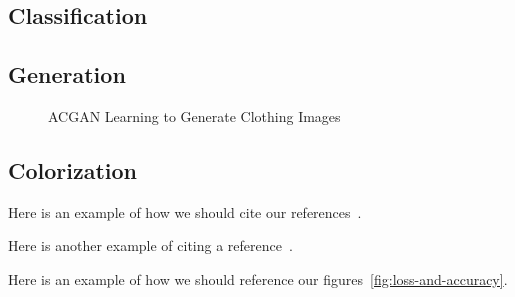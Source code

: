 \documentclass[conference]{IEEEtran}
\begin{document}
    \subsection{Classification}\label{subsec:results-classification}

    \subsection{Generation}\label{subsec:results-generation}

    \begin{figure}
        \caption{ACGAN Learning to Generate Clothing Images}
        \label{fig:results1}
        \centering
    \end{figure}

    \subsection{Colorization}\label{subsec:results-colorization}

    Here is an example of how we should cite our references~\cite{e-in-style}.

    Here is another example of citing a reference~\cite{pytorch-generative-model-collections}.

    Here is an example of how we should reference our figures~\autoref{fig:loss-and-accuracy}.
\end{document}
